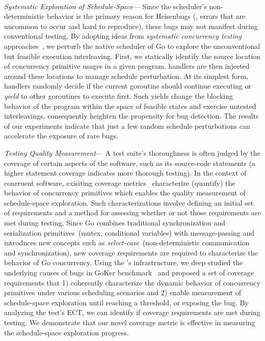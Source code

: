 \\
 \textit{Systematic Exploration of Schedule-Space}---
Since the scheduler's non-deterministic behavior is the primary reason for Heisenbugs (\ie, errors that are uncommon to occur and hard to reproduce), these bugs may not manifest during conventional testing.
%
By adopting ideas from \textit{systematic concurrency testing} approaches~\cite{dpor,thomson-concurrencyTesting-ppopp14,emmi-delayBounded-popl11,burckhardt-depthBug-asplos10,madanlal-preemptionBound-pldi07,yu-maple-oopsla12,joshi-calfuzzer,contest-jgi01,edelstein2003contest,hong-syncTesting-issta12,christakis-erlang-icst13,yuan-morpheus-asplos20}, we perturb the native scheduler of Go to explore the unconventional but feasible execution interleaving.
%
First, we statically identify the source location of concurrency primitive usages in a given program.
%
\goat handlers are then injected around these locations to manage schedule perturbation.
%
At its simplest form, handlers randomly decide if the current goroutine should continue executing or \textit{yield} to other goroutines to execute first.
%
Such yields change the blocking behavior of the program within the space of feasible states and exercise untested interleavings, consequently heighten the propensity for bug detection.
%
The results of our experiments indicate that just a few random schedule perturbations can accelerate the exposure of rare bugs.

 \textit{Testing Quality Measurement}---
A test suite's thoroughness is often judged by the coverage of certain aspects of the software, such as its source-code statements (a higher statement coverage indicates more thorough testing).
%
In the context of conrruent software, exisiting coverage metrics~\cite{edelstein2003contest,trainin-followsCoverage-padtad09,hong-syncTesting-issta12,yu-pset-isca09} characterize (quantify) the behavior of concurrency primitives which enables the quality measurement of schedule-space exploration.
%
Such characterizations involve defining an initial set of requirements and a method for assessing whether or not those requirements are met during testing.
%
Since Go combines traditional synchronization and serialization primitives~(mutex, conditional variables) with message-passing and introduces new concepts such as \textit{select-case}~(non-deterministic communication and synchronization), new coverage requirements are required to characterize the behavior of Go concurrency.
%
Using the \goat's infrastructure, we deep studied the underlying causes of bugs in GoKer benchmark~\cite{yuan-gobench-cgo21} and proposed a set of coverage requirements that 1) coherently characterize the dynamic behavior of concurrency primitives under various scheduling scenarios and 2) enable measurement of schedule-space exploration until reaching a threshold, or exposing the bug.
%
By analyzing the test's ECT, we can identify if coverage requirements are met during testing.
%
We demonstrate that our novel coverage metric is effective in measuring the schedule-space exploration progress.


